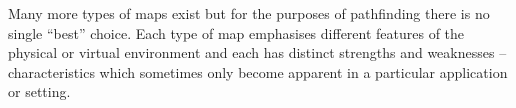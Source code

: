 %
%
Many more types of maps exist but for the purposes of pathfinding there is no single ``best'' choice.
Each type of map emphasises different features of the physical or virtual environment and each 
has distinct strengths and weaknesses -- characteristics which sometimes only become apparent in 
a particular application or setting. 

